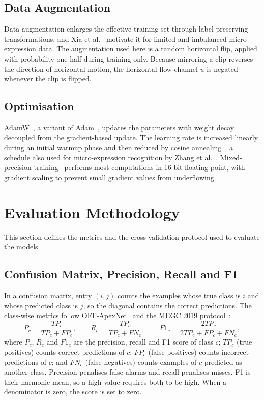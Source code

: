 \subsection{Data Augmentation}
\label{sec:augmentation}

Data augmentation enlarges the effective training set through label-preserving transformations, and Xia et al.~\cite{xia2020a} motivate it for limited and imbalanced micro-expression data. The augmentation used here is a random horizontal flip, applied with probability one half during training only. Because mirroring a clip reverses the direction of horizontal motion, the horizontal flow channel $u$ is negated whenever the clip is flipped.

\subsection{Optimisation}
\label{sec:optimisation}

AdamW~\cite{loshchilov2019}, a variant of Adam~\cite{kingma2015}, updates the parameters with weight decay decoupled from the gradient-based update. The learning rate is increased linearly during an initial warmup phase and then reduced by cosine annealing~\cite{loshchilov2017}, a schedule also used for micro-expression recognition by Zhang et al.~\cite{zhang2022}. Mixed-precision training~\cite{micikevicius2018} performs most computations in 16-bit floating point, with gradient scaling to prevent small gradient values from underflowing.


\section{Evaluation Methodology}
\label{sec:evaluation}

This section defines the metrics and the cross-validation protocol used to evaluate the models.

\subsection{Confusion Matrix, Precision, Recall and F1}
\label{sec:confusion-matrix}

In a confusion matrix, entry $(i,j)$ counts the examples whose true class is $i$ and whose predicted class is $j$, so the diagonal contains the correct predictions. The class-wise metrics follow OFF-ApexNet~\cite{liong2019a} and the MEGC 2019 protocol~\cite{see2019}:
\begin{equation}
	P_c=\frac{TP_c}{TP_c+FP_c},\qquad
	R_c=\frac{TP_c}{TP_c+FN_c},\qquad
	F1_c=\frac{2TP_c}{2TP_c+FP_c+FN_c},
	\label{eq:prf}
\end{equation}
where $P_c$, $R_c$ and $F1_c$ are the precision, recall and F1 score of class $c$; $TP_c$ (true positives) counts correct predictions of $c$; $FP_c$ (false positives) counts incorrect predictions of $c$; and $FN_c$ (false negatives) counts examples of $c$ predicted as another class. Precision penalises false alarms and recall penalises misses. F1 is their harmonic mean, so a high value requires both to be high. When a denominator is zero, the score is set to zero.

